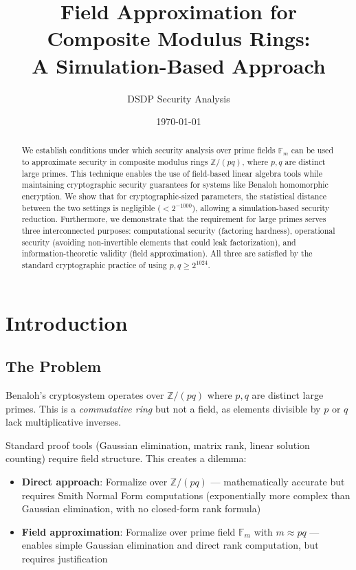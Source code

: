 \documentclass[11pt]{article}
\title{Field Approximation for Composite Modulus Rings:\\
A Simulation-Based Approach}
\author{DSDP Security Analysis}
\date{\today}
\theoremstyle{definition}
\begin{document}
\maketitle

\begin{abstract}
We establish conditions under which security analysis over prime fields $\mathbb{F}_m$ 
can be used to approximate security in composite modulus rings $\mathbb{Z}/(pq)$, 
where $p,q$ are distinct large primes. This technique enables the use of field-based 
linear algebra tools while maintaining cryptographic security guarantees for systems 
like Benaloh homomorphic encryption. We show that for cryptographic-sized parameters, 
the statistical distance between the two settings is negligible ($< 2^{-1000}$), 
allowing a simulation-based security reduction. Furthermore, we demonstrate that 
the requirement for large primes serves three interconnected purposes: computational 
security (factoring hardness), operational security (avoiding non-invertible elements 
that could leak factorization), and information-theoretic validity (field approximation). 
All three are satisfied by the standard cryptographic practice of using $p, q \geq 2^{1024}$.
\end{abstract}

\section{Introduction}

\subsection{The Problem}

Benaloh's cryptosystem operates over $\mathbb{Z}/(pq)$ where $p,q$ are distinct large primes. 
This is a \emph{commutative ring} but not a field, as elements divisible by $p$ or $q$ 
lack multiplicative inverses.

Standard proof tools (Gaussian elimination, matrix rank, linear solution counting) 
require field structure. This creates a dilemma:
\begin{itemize}
\item \textbf{Direct approach}: Formalize over $\mathbb{Z}/(pq)$ --- mathematically accurate but requires Smith Normal Form computations (exponentially more complex than Gaussian elimination, with no closed-form rank formula)
\item \textbf{Field approximation}: Formalize over prime field $\mathbb{F}_m$ with $m \approx pq$ --- enables simple Gaussian elimination and direct rank computation, but requires justification
\end{itemize}
\end{document}
